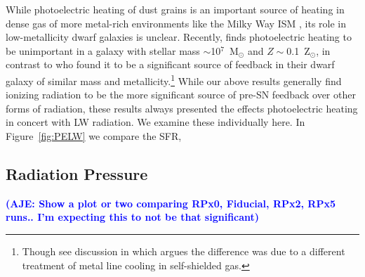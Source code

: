 \documentclass[twocolumn]{aastex62}
\newcommand{\aje}[1]{\textcolor{blue}{\textbf{(AJE: #1)}}}
\begin{document}
While photoelectric heating of dust grains is an important source of heating in dense gas of more metal-rich environments like the Milky Way ISM \citep[e.g.][]{BakesTielens1994,Wolfire2003}, its role in low-metallicity dwarf galaxies is unclear. Recently, \cite{Hu2017} finds photoelectric heating to be unimportant in a galaxy with stellar mass $\sim$10$^{7}$~M$_{\odot}$ and $Z\sim$0.1~Z$_{\odot}$, in contrast to \cite{Forbes2016} who found it to be a significant source of feedback in their dwarf galaxy of similar mass and metallicity.\footnote{Though see discussion in \cite{Hu2017} which argues the difference was due to a different treatment of metal line cooling in self-shielded gas.} While our above results generally find ionizing radiation to be the more significant source of pre-SN feedback over other forms of radiation, these results always presented the effects photoelectric heating in concert with LW radiation. We examine these individually here. In Figure~\ref{fig:PELW} we compare the SFR, 

\subsection{Radiation Pressure}

\aje{Show a plot or two comparing RPx0, Fiducial, RPx2, RPx5 runs.. I'm expecting this to not be that significant}

%
%
%
%
%
%
\end{document}

